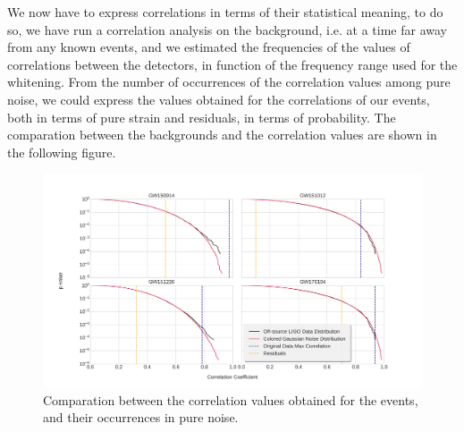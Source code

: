 \documentclass[a4paper,11pt]{article}
\begin{document}
We now have to express correlations in terms of their statistical meaning, to do so, we have run a correlation analysis on the background, i.e. at a time far away from any known events, and we estimated the frequencies of the values of correlations between the detectors, in function of the frequency range used for the whitening. From the number of occurrences of the correlation values among pure noise, we could express the values obtained for the correlations of our events, both in terms of pure strain and residuals, in terms of probability. The comparation between the backgrounds and the correlation values are shown in the following figure.

\begin{figure}[]
  \centering
    \includegraphics[width=\columnwidth]{AllBackgrounds.png}
\caption{Comparation between the correlation values obtained for the events, and their occurrences in pure noise.}
\label{fig:Backgrounds}
\end{figure}
\end{document}
